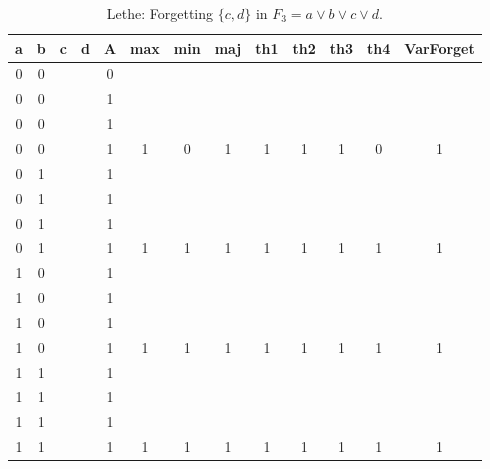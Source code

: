 \begin{table}[!tb]
    \centering
    \begin{tabular}{|c|c|c|c|c|c|c|c|c|c|c|c|c|}
        \hline
        \textbf{a} & \textbf{b} & \textbf{c} & \textbf{d} & \textbf{A} & \textbf{max} & \textbf{min} & \textbf{maj} & \textbf{th1} & \textbf{th2} & \textbf{th3} & \textbf{th4} & \textbf{VarForget} \\ \hline
        \rowcolor{gray!40} 0 & 0 &  &  & 0 &  &  &  &  &  &  &  &  \\ \hline
        \rowcolor{gray!40} 0 & 0 &  &  & 1 &  &  &  &  &  &  &  &  \\ \hline
        \rowcolor{gray!40} 0 & 0 &  &  & 1 &  &  &  &  &  &  &  &  \\ \hline
        \rowcolor{gray!40} 0 & 0 &  &  & 1 & 1 & 0 & 1 & 1 & 1 & 1 & 0 & 1 \\ \hline
        \rowcolor{blue!40} 0 & 1 &  &  & 1 &  &  &  &  &  &  &  &  \\ \hline
        \rowcolor{blue!40} 0 & 1 &  &  & 1 &  &  &  &  &  &  &  &  \\ \hline
        \rowcolor{blue!40} 0 & 1 &  &  & 1 &  &  &  &  &  &  &  &  \\ \hline
        \rowcolor{blue!40} 0 & 1 &  &  & 1 & 1 & 1 & 1 & 1 & 1 & 1 & 1 & 1 \\ \hline
        \rowcolor{red!40} 1 & 0 &  &  & 1 &  &  &  &  &  &  &  &  \\ \hline
        \rowcolor{red!40} 1 & 0 &  &  & 1 &  &  &  &  &  &  &  &  \\ \hline
        \rowcolor{red!40} 1 & 0 &  &  & 1 &  &  &  &  &  &  &  &  \\ \hline
        \rowcolor{red!40} 1 & 0 &  &  & 1 & 1 & 1 & 1 & 1 & 1 & 1 & 1 & 1 \\ \hline
        \rowcolor{green!40} 1 & 1 &  &  & 1 &  &  &  &  &  &  &  &  \\ \hline
        \rowcolor{green!40} 1 & 1 &  &  & 1 &  &  &  &  &  &  &  &  \\ \hline
        \rowcolor{green!40} 1 & 1 &  &  & 1 &  &  &  &  &  &  &  &  \\ \hline
        \rowcolor{green!40} 1 & 1 &  &  & 1 & 1 & 1 & 1 & 1 & 1 & 1 & 1 & 1 \\ \hline
    \end{tabular}
    \caption{Lethe: Forgetting $\{c, d\}$ in $F_{3} = a \lor b \lor c \lor d$.}
    \label{tab:lethe-F3-cd}
\end{table}

